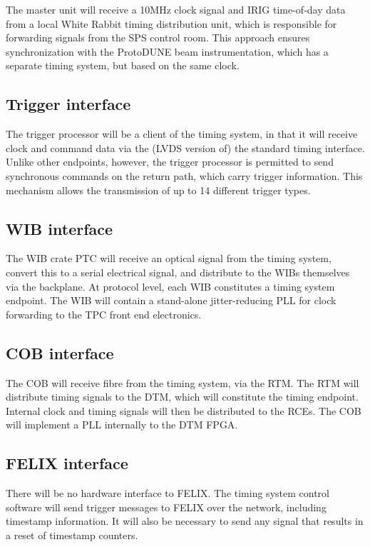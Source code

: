 \documentclass[a4paper,11pt]{article}
\begin{document}
The master unit will receive a 10MHz clock signal and IRIG time-of-day data from a local White Rabbit timing distribution unit, which is responsible for forwarding signals from the SPS control room. This approach ensures synchronization with the ProtoDUNE beam instrumentation, which has a separate timing system, but based on the same clock.

\subsection{Trigger interface}

The trigger processor will be a client of the timing system, in that it will receive clock and command data via the (LVDS version of) the standard timing interface. Unlike other endpoints, however, the trigger processor is permitted to send synchronous commands on the return path, which carry trigger information. This mechanism allows the transmission of up to 14 different trigger types.

\subsection{WIB interface}

The WIB crate PTC will receive an optical signal from the timing system, convert this to a serial electrical signal, and distribute to the WIBs themselves via the backplane. At protocol level, each WIB constitutes a timing system endpoint. The WIB will contain a stand-alone jitter-reducing PLL for clock forwarding to the TPC front end electronics. 

\subsection{COB interface}

The COB will receive fibre from the timing system, via the RTM. The RTM will distribute timing signals to the DTM, which will constitute the timing endpoint. Internal clock and timing signals will then be distributed to the RCEs. The COB will implement a PLL internally to the DTM FPGA.

\subsection{FELIX interface}

There will be no hardware interface to FELIX. The timing system control software will send trigger messages to FELIX over the network, including timestamp information.  It will also be necessary to send any signal that results in a reset of timestamp counters.
\end{document}
